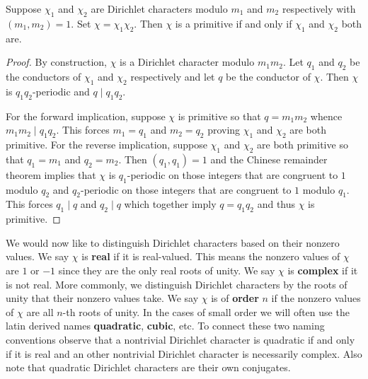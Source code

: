 \documentclass[12pt]{article}
\begin{document}
      \begin{proposition}\label{prop:primitive_characters_multiplicative_relatively_prime}
        Suppose \(\chi_{1}\) and \(\chi_{2}\) are Dirichlet characters modulo \(m_{1}\) and \(m_{2}\) respectively with \((m_{1},m_{2}) = 1\). Set \(\chi = \chi_{1}\chi_{2}\). Then \(\chi\) is a primitive if and only if \(\chi_{1}\) and \(\chi_{2}\) both are.
      \end{proposition}
      \begin{proof}
        By construction, \(\chi\) is a Dirichlet character modulo \(m_{1}m_{2}\). Let \(q_{1}\) and \(q_{2}\) be the conductors of \(\chi_{1}\) and \(\chi_{2}\) respectively and let \(q\) be the conductor of \(\chi\). Then \(\chi\) is \(q_{1}q_{2}\)-periodic and \(q \mid q_{1}q_{2}\).
        
        For the forward implication, suppose \(\chi\) is primitive so that \(q = m_{1}m_{2}\) whence \(m_{1}m_{2} \mid q_{1}q_{2}\). This forces \(m_{1} = q_{1}\) and \(m_{2} = q_{2}\) proving \(\chi_{1}\) and \(\chi_{2}\) are both primitive. For the reverse implication, suppose \(\chi_{1}\) and \(\chi_{2}\) are both primitive so that \(q_{1} = m_{1}\) and \(q_{2} = m_{2}\). Then \((q_{1},q_{1}) = 1\) and the Chinese remainder theorem implies that \(\chi\) is \(q_{1}\)-periodic on those integers that are congruent to \(1\) modulo \(q_{2}\) and \(q_{2}\)-periodic on those integers that are congruent to \(1\) modulo \(q_{1}\). This forces \(q_{1} \mid q\) and \(q_{2} \mid q\) which together imply \(q = q_{1}q_{2}\) and thus \(\chi\) is primitive.
      \end{proof}
      
      We would now like to distinguish Dirichlet characters based on their nonzero values. We say \(\chi\) is \textbf{real} if it is real-valued. This means the nonzero values of \(\chi\) are \(1\) or \(-1\) since they are the only real roots of unity. We say \(\chi\) is \textbf{complex} if it is not real. More commonly, we distinguish Dirichlet characters by the roots of unity that their nonzero values take. We say \(\chi\) is of \textbf{order} \(n\) if the nonzero values of \(\chi\) are all \(n\)-th roots of unity. In the cases of small order we will often use the latin derived names \textbf{quadratic}, \textbf{cubic}, etc. To connect these two naming conventions observe that a nontrivial Dirichlet character is quadratic if and only if it is real and an other nontrivial Dirichlet character is necessarily complex. Also note that quadratic Dirichlet characters are their own conjugates.
      
\end{document}
